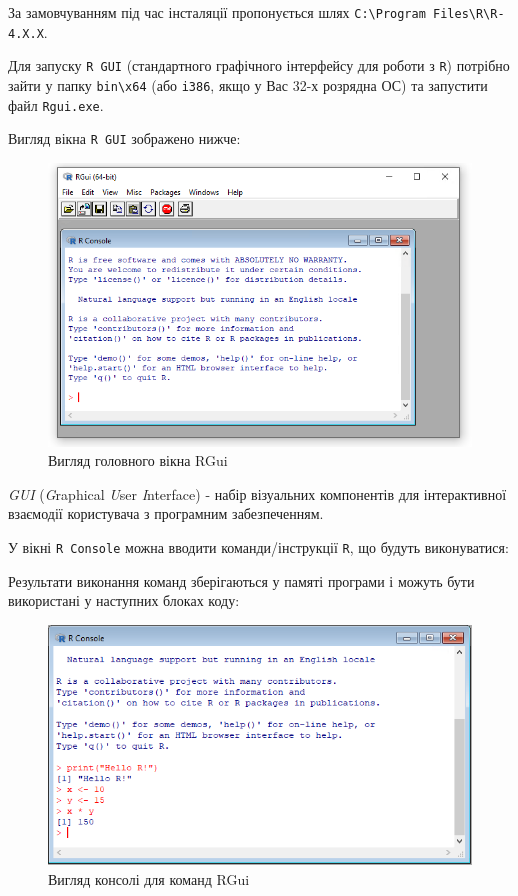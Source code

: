 \documentclass[
]{book}
\begin{document}
За замовчуванням під час інсталяції пропонується шлях \texttt{C:\textbackslash{}Program\ Files\textbackslash{}R\textbackslash{}R-4.X.X}.

Для запуску \texttt{R\ GUI} (стандартного графічного інтерфейсу для роботи з \texttt{R}) потрібно зайти у папку \texttt{bin\textbackslash{}x64} (або \texttt{i386}, якщо у Вас 32-х розрядна ОС) та запустити файл \texttt{Rgui.exe}.

Вигляд вікна \texttt{R\ GUI} зображено нижче:

\begin{figure}
\includegraphics[width=9.61in]{images/chapter1/r_gui_4} \caption{Вигляд головного вікна RGui}\label{fig:unnamed-chunk-5}
\end{figure}

\emph{GUI} (\emph{G}raphical \emph{U}ser \emph{I}nterface) - набір візуальних компонентів для інтерактивної взаємодії користувача з програмним забезпеченням.

У вікні \texttt{R\ Console} можна вводити команди/інструкції \texttt{R}, що будуть виконуватися:

Результати виконання команд зберігаються у памяті програми і можуть бути використані у наступних блоках коду:

\begin{figure}
\includegraphics[width=8.71in]{images/chapter1/r_gui_5} \caption{Вигляд консолі для команд RGui}\label{fig:unnamed-chunk-6}
\end{figure}
\end{document}
